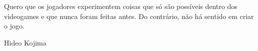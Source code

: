 \begin{epigrafe}
    \vspace*{\fill}
    
	\hspace{.45\textwidth}
	\begin{minipage}{.5\textwidth}
		Quero que os jogadores experimentem coisas que só são possíveis dentro dos videogames e que nunca foram feitas antes. Do contrário, não há sentido em criar o jogo.
			
		\begin{flushright}			
			Hideo Kojima
		\end{flushright}
	\end{minipage}%
\end{epigrafe}
